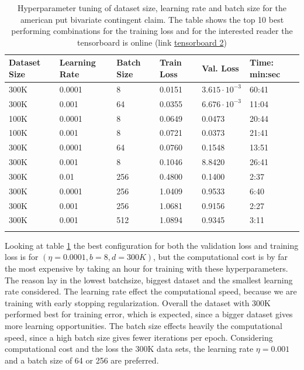 \begin{table}[th]
\caption{Hyperparameter tuning of dataset size, learning rate and batch size for the american put bivariate contingent claim. The table shows the top 10 best performing combinations for the training loss and for the interested reader the tensorboard is online (link \href{https://tensorboard.dev/experiment/mQWtOskJRoWrmrFgOIVQ4g/}{tensorboard 2})}
\label{tab:hyperAmerMin1}
\centering
\begin{tabular}{llllll}
\toprule
\textbf{Dataset Size} & \textbf{Learning Rate} & \textbf{Batch Size} & \textbf{Train Loss} & \textbf{Val. Loss} & \textbf{Time: min:sec} \\
\midrule
300K    & 0.0001 & 8     & 0.0151 & $3.615\cdot 10^{-3}$ & 60:41\\ 
300K    & 0.001  & 64    & 0.0355 & $6.676\cdot 10^{-3}$ & 11:04\\ 
100K    & 0.0001 & 8     & 0.0649 & 0.0473 & 20:44\\ 
100K    & 0.001  & 8     & 0.0721 & 0.0373 & 21:41\\ 
300K    & 0.0001 & 64    & 0.0760 & 0.1548 & 13:51\\ 
300K    & 0.001  & 8     & 0.1046 & 8.8420 & 26:41\\ 
300K    & 0.01   & 256   & 0.4800 & 0.1400 & 2:37\\ 
300K    & 0.0001 & 256   & 1.0409 & 0.9533 & 6:40\\ 
300K    & 0.001  & 256   & 1.0681 & 0.9156 & 2:27 \\ 
300K    & 0.001  & 512   & 1.0894 & 0.9345 & 3:11 \\ 
\bottomrule\\
\end{tabular}
\end{table}

Looking at table \ref{tab:hyperAmerMin1} the best configuration for both the validation loss and training loss is for $(\eta=0.0001, b=8, d=300K)$, but the computational cost is by far the most expensive by taking an hour for training with these hyperparameters. The reason lay in the lowest batchsize, biggest dataset and the smallest learning rate considered. The learning rate effect the computational speed, because we are training with early stopping regularization. Overall the dataset with 300K performed best for training error, which is expected, since a bigger dataset gives more learning opportunities. The batch size effects heavily the computational speed, since a high batch size gives fewer iterations per epoch. Considering computational cost and the loss the 300K data sets, the learning rate $\eta=0.001$ and a batch size of 64 or 256 are preferred.\\

